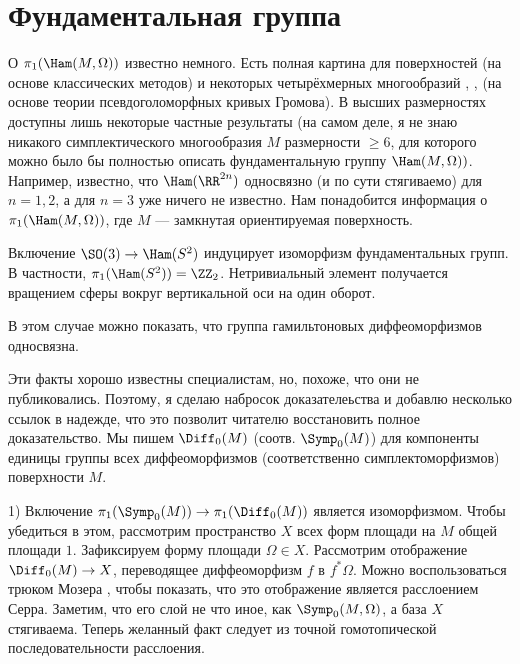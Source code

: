 \section{Фундаментальная группа}
О $\pi_1 (\Ham (M, \Omega))$ известно немного.
Есть полная картина для поверхностей (на основе классических методов) и некоторых четырёхмерных многообразий \cite{G1}, \cite{A}, \cite{AM} (на основе теории псевдоголоморфных кривых Громова).
В высших размерностях доступны лишь некоторые частные результаты (на самом деле, я не знаю никакого симплектического многообразия $M$ размерности $\ge 6$, для которого можно было бы полностью описать фундаментальную группу $\Ham (M, \Omega))$.
Например, известно, что $\Ham (\RR^{2n})$ односвязно (и по сути стягиваемо) для $n = 1, 2$, а для $n = 3$ уже ничего не известно.
Нам понадобится информация о $\pi_1 (\Ham (M, \Omega))$, где $M$ --- замкнутая ориентируемая поверхность.

\begin{thm}{}\label{7.2.A}
Включение $\SO (3) \to \Ham (S^2)$ индуцирует изоморфизм фундаментальных групп.
В частности, $\pi_1 (\Ham (S^2))=\ZZ_2$.
Нетривиальный элемент получается вращением сферы вокруг вертикальной оси на один оборот.
\end{thm}

\begin{thm}{}
\label{7.2.B}
В этом случае можно показать, что группа гамильтоновых диффеоморфизмов односвязна.
\end{thm}

Эти факты хорошо известны специалистам, но, похоже, что они не публиковались.
Поэтому, я сделаю набросок доказателеьства и добавлю несколько ссылок в надежде, что это позволит читателю восстановить полное доказательство.
Мы пишем $\Diff_0 (M)$ (соотв. $\Symp_0 (M)$) для компоненты единицы группы всех диффеоморфизмов (соответственно симплектоморфизмов) поверхности $M$.


1) Включение $\pi_1 (\Symp_0 (M)) \to \pi_1 (\Diff_0 (M))$ является изоморфизмом.
Чтобы убедиться в этом, рассмотрим пространство $X$ всех форм площади на $M$ общей площади $1$.
Зафиксируем форму площади $\Omega \in X$.
Рассмотрим отображение $\Diff_0 (M) \to X$, переводящее диффеоморфизм $f$ в $f^\ast \Omega$.
Можно воспользоваться трюком Мозера \cite[p. 94--95]{MS}, чтобы показать, что это отображение является расслоением Серра.
Заметим, что его слой не что иное, как $\Symp_0 (M, \Omega)$, а база $X$ стягиваема.
Теперь желанный факт следует из точной гомотопической последовательности расслоения.

